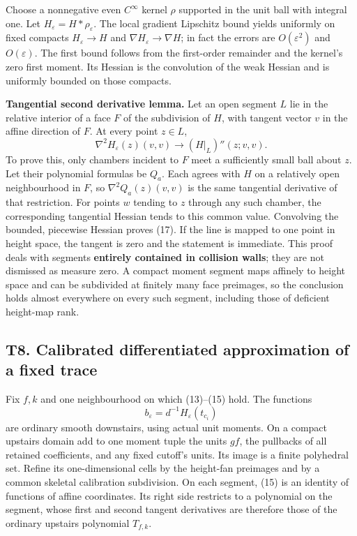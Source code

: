 \documentclass[
  10pt,
]{article}
\begin{document}
Choose a nonnegative even \(C^\infty\) kernel \(\rho\) supported in the
unit ball with integral one. Let \(H_\varepsilon=H*\rho_\varepsilon\).
The local gradient Lipschitz bound yields uniformly on fixed compacts
\(H_\varepsilon\to H\) and \(\nabla H_\varepsilon\to\nabla H\); in fact
the errors are \(O(\varepsilon^2)\) and \(O(\varepsilon)\). The first
bound follows from the first-order remainder and the kernel's zero first
moment. Its Hessian is the convolution of the weak Hessian and is
uniformly bounded on those compacts.

\textbf{Tangential second derivative lemma.} Let an open segment \(L\)
lie in the relative interior of a face \(F\) of the subdivision of
\(H\), with tangent vector \(v\) in the affine direction of \(F\). At
every point \(z\in L\), \[
        \nabla^2H_\varepsilon(z)(v,v)
                  \longrightarrow (H|_L)''(z;v,v).       \tag{17}
\] To prove this, only chambers incident to \(F\) meet a sufficiently
small ball about \(z\). Let their polynomial formulas be \(Q_a\). Each
agrees with \(H\) on a relatively open neighbourhood in \(F\), so
\(\nabla^2Q_a(z)(v,v)\) is the same tangential derivative of that
restriction. For points \(w\) tending to \(z\) through any such chamber,
the corresponding tangential Hessian tends to this common value.
Convolving the bounded, piecewise Hessian proves (17). If the line is
mapped to one point in height space, the tangent is zero and the
statement is immediate. This proof deals with segments \textbf{entirely
contained in collision walls}; they are not dismissed as measure zero. A
compact moment segment maps affinely to height space and can be
subdivided at finitely many face preimages, so the conclusion holds
almost everywhere on every such segment, including those of deficient
height-map rank.

\subsection{T8. Calibrated differentiated approximation of a fixed
trace}\label{t8.-calibrated-differentiated-approximation-of-a-fixed-trace}

Fix \(f,k\) and one neighbourhood on which (13)--(15) hold. The
functions \[
                b_\varepsilon=d^{-1}H_\varepsilon(t_{c_i})
                                                               \tag{18}
\] are ordinary smooth downstairs, using actual unit moments. On a
compact upstairs domain add to one moment tuple the units \(gf\), the
pullbacks of all retained coefficients, and any fixed cutoff's units.
Its image is a finite polyhedral set. Refine its one-dimensional cells
by the height-fan preimages and by a common skeletal calibration
subdivision. On each segment, (15) is an identity of functions of affine
coordinates. Its right side restricts to a polynomial on the segment,
whose first and second tangent derivatives are therefore those of the
ordinary upstairs polynomial \(T_{f,k}\).
\end{document}
